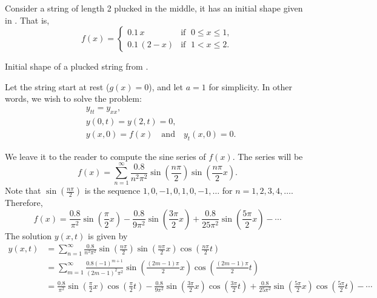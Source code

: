 \begin{example} \label{example:pluckedstring}
Consider a string of length 2 plucked in the middle,
it has an initial shape given in .
That is,
\begin{equation*}
f(x) = \begin{cases}
0.1\, x & \text{if } \; 0 \leq x \leq 1 , \\
0.1\, (2-x) & \text{if } \; 1 < x \leq 2 .
\end{cases}
\end{equation*}

\begin{myfig}
\capstart
{}
\caption{Initial shape of a plucked string from
.\label{wave:pluckedstrfig}}
\end{myfig}

Let the string start at rest ($g(x) =
0$), and let $a=1$ for simplicity.  In other words, we wish to
solve the problem:
\begin{align*}
& y_{tt} = y_{xx}, \\
& y(0,t) = y(2,t)= 0 , \\
& y(x,0) = f(x) \quad \text{and} \quad y_t(x,0)= 0 .
\end{align*}

We leave it to the reader to compute the sine series of $f(x)$.  The series
will be
\begin{equation*}
f(x) = \sum_{n=1}^\infty
\frac{0.8}{n^2 \pi^2}
\sin \left( \frac{n \pi}{2} \right)
\sin \left( \frac{n \pi}{2} x \right) .
\end{equation*}
Note that 
$\sin \left( \frac{n \pi}{2} \right)$
is the sequence $1, 0, -1, 0, 1, 0, -1, \ldots$
for $n = 1,2,3,4,\ldots$.  Therefore,
\begin{equation*}
f(x) = 
\frac{0.8}{\pi^2}
\sin \left( \frac{\pi}{2} x \right)
-
\frac{0.8}{9 \pi^2}
\sin \left( \frac{3 \pi}{2} x \right)
+
\frac{0.8}{25 \pi^2}
\sin \left( \frac{5 \pi}{2} x \right)
- \cdots
\end{equation*}
The solution $y(x,t)$ is given by
\begin{equation*}
\begin{split}
y(x,t) & = 
\sum_{n=1}^\infty
\frac{0.8}{n^2 \pi^2}
\sin \left( \frac{n \pi}{2} \right)
\sin \left( \frac{n \pi}{2} x \right)
\cos \left( \frac{n \pi}{2} t \right)
\\
& = 
\sum_{m=1}^\infty
\frac{0.8 {(-1)}^{m+1}}{{(2m-1)}^2 \pi^2}
\sin \left( \frac{(2m-1) \pi}{2} x \right)
\cos \left( \frac{(2m-1) \pi}{2} t \right)
\\
& =
\frac{0.8}{\pi^2} 
\sin \left( \frac{\pi}{2}  x \right)
\cos \left( \frac{\pi}{2}  t \right)
-
\frac{0.8}{9 \pi^2} 
\sin \left( \frac{3 \pi}{2}  x \right)
\cos \left( \frac{3 \pi}{2}  t \right)
+
\frac{0.8}{25 \pi^2}
\sin \left( \frac{5 \pi}{2}  x \right)
\cos \left( \frac{5 \pi}{2}  t \right) 
- \cdots
\end{split}
\end{equation*}


\end{example}

